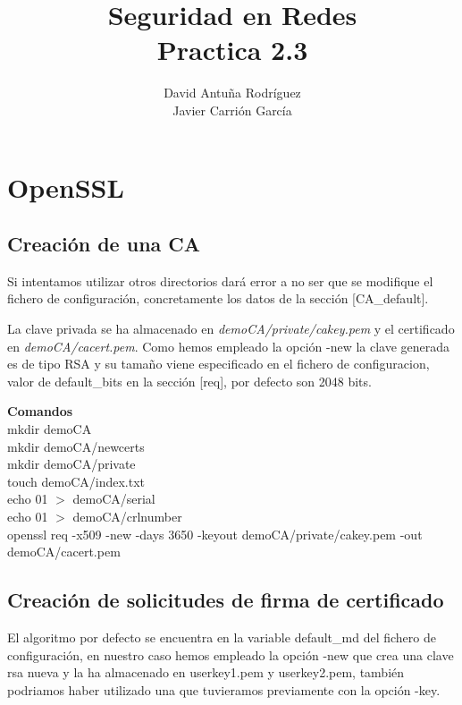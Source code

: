 \documentclass[11pt]{article}
\title{\Large Seguridad en Redes\\Practica 2.3}
\author{David Antuña Rodríguez\\Javier Carrión García}
\date{}
\begin{document}
  \raggedright

  \maketitle
  \newpage

  \section{OpenSSL}
    \subsection{Creación de una CA}
      \par
      Si intentamos utilizar otros directorios dará error a no ser que se modifique el fichero de
      configuración, concretamente los datos de la sección [CA\_default].

      \par
      La clave privada se ha almacenado en \textit{demoCA/private/cakey.pem} y el certificado en
      \textit{demoCA/cacert.pem}. Como hemos empleado la opción -new la clave generada es de tipo
      RSA y su tamaño viene especificado en el fichero de configuracion, valor de default\_bits
      en la sección [req], por defecto son 2048 bits.

      \par
      \textbf{Comandos}\\
      mkdir demoCA\\
      mkdir demoCA/newcerts\\
      mkdir demoCA/private\\
      touch demoCA/index.txt\\
      echo 01 $>$ demoCA/serial\\
      echo 01 $>$ demoCA/crlnumber\\
      openssl req -x509 -new -days 3650 -keyout demoCA/private/cakey.pem -out demoCA/cacert.pem

    \subsection{Creación de solicitudes de firma de certificado}
      \par
      El algoritmo por defecto se encuentra en la variable default\_md del fichero de configuración,
      en nuestro caso hemos empleado la opción -new que crea una clave rsa nueva y la ha almacenado
      en userkey1.pem y userkey2.pem, también podriamos haber utilizado una que tuvieramos
      previamente con la opción -key.
\end{document}
